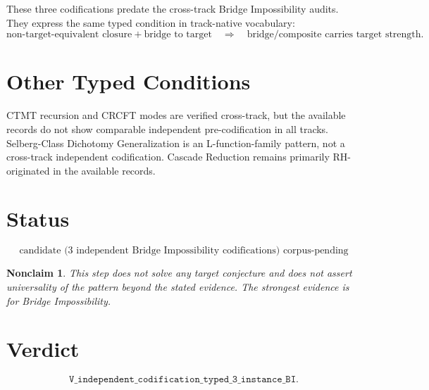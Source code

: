 \documentclass[11pt]{article}
\newtheorem{nonclaim}{Nonclaim}
\begin{document}
These three codifications predate the cross-track Bridge Impossibility audits. They express the same typed condition in track-native vocabulary:
\[
  \text{non-target-equivalent closure} + \text{bridge to target}
  \quad\Rightarrow\quad
  \text{bridge/composite carries target strength}.
\]

\section{Other Typed Conditions}

CTMT recursion and CRCFT modes are verified cross-track, but the available records do not show comparable independent pre-codification in all tracks. Selberg-Class Dichotomy Generalization is an L-function-family pattern, not a cross-track independent codification. Cascade Reduction remains primarily RH-originated in the available records.

\section{Status}

\[
\boxed{\text{candidate (3 independent Bridge Impossibility codifications) corpus-pending}}
\]

\begin{nonclaim}
This step does not solve any target conjecture and does not assert universality of the pattern beyond the stated evidence. The strongest evidence is for Bridge Impossibility.
\end{nonclaim}

\section{Verdict}

\[
\texttt{V\_independent\_codification\_typed\_3\_instance\_BI}.
\]
\end{document}
